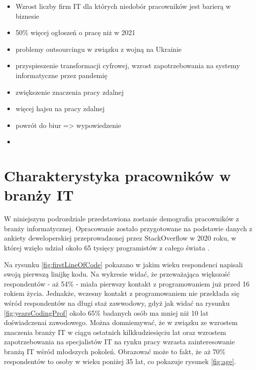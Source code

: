 \begin{itemize}
    \item Wzrost liczby firm IT dla których niedobór pracowników jest barierą w biznesie \cite{https://www.rp.pl/rynek-pracy/art35856021-wojna-nasili-niedobor-kadr-w-it-naplyw-nowych-zlecen-do-polski}
    \item 50\% więcej ogłoszeń o pracę niż w 2021\cite{https://www.rp.pl/rynek-pracy/art35856021-wojna-nasili-niedobor-kadr-w-it-naplyw-nowych-zlecen-do-polski}
    \item problemy outsourcingu w związku z wojną na Ukrainie \cite{https://www.computerworld.pl/news/Wojna-w-Ukrainie-stawia-globalny-outsourcing-IT-w-trudnej-sytuacji,437151.html}
    \item przyspieszenie transformacji cyfrowej,  wzrost zapotrzebowania na systemy informatyczne przez pandemię \cite{https://itwiz.pl/sytuacja-na-rynku-pracy-it-w-dobie-koronawirusa/}
    \item zwiększenie znaczenia pracy zdalnej \cite{https://antyweb.pl/praca-zdalna-w-it}
    \item więcej hajsu na pracy zdalnej \cite{https://cyberdefence24.pl/biznes-i-finanse/polscy-pracodawcy-nie-chca-pracy-zdalnej-branza-it-zachowuje-elastycznosc}
    \item powrót do biur => wypowiedzenie \cite{https://geek.justjoin.it/przymusowy-powrot-do-biura-z-home-office-w-branzy-it-64-proc-wrociloby-z-wypowiedzeniem}
    \item
\end{itemize}


\section{Charakterystyka pracowników w branży IT}

W niniejszym podrozdziale przedstawiona zostanie demografia pracowników z branży informatycznej.
Opracowanie zostało przygotowane na podstawie danych z ankiety deweloperskiej przeprowadzonej przez StackOverflow w 2020 roku, w której wzięło udział około 65 tysięcy programistów z całego świata \cite{so-survey-2020}.

Na rysunku \ref{fig:firstLineOfCode} pokazano w jakim wieku respondenci napisali swoją pierwszą linijkę kodu.
Na wykresie widać, że przeważająca większość respondentów - aż 54\% - miała pierwszy kontakt z programowaniem już przed 16 rokiem życia.
Jednakże, wczesny kontakt z programowaniem nie przekłada się wśród respondentów na długi staż zawwodowy, gdyż jak widać na rysunku \ref{fig:yearsCodingProf} około 65\% badanych osób ma mniej niż 10 lat doświadczenai zawodowego.
Można domniemywać, że w związku ze wzrostem znaczenia branży IT w ciągu ostatnich kilkkudziesięciu lat oraz wzrostem zapotrzebowania na specjalistów IT na rynku pracy wzrasta zainteresowanie branżą IT wśród młodszych pokoleń.
Obrazować może to fakt, że aż 70\% respondentów to osoby w wieku poniżej 35 lat, co pokazuje rysunek \ref{fig:age}.



